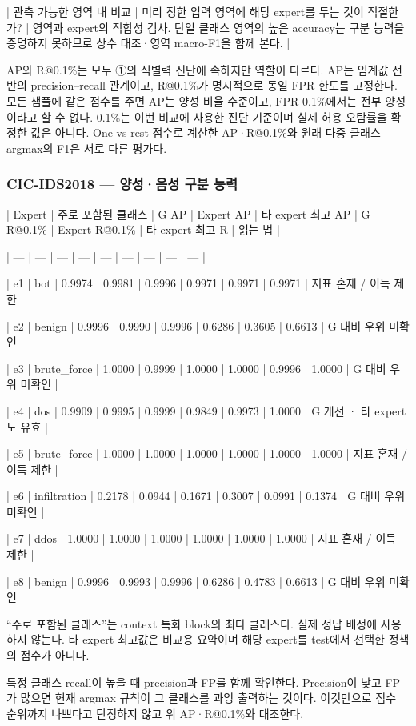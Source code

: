 | 관측 가능한 영역 내 비교 | 미리 정한 입력 영역에 해당 expert를 두는 것이 적절한가? | 영역과 expert의 적합성 검사. 단일 클래스 영역의 높은 accuracy는 구분 능력을 증명하지 못하므로 상수 대조·영역 macro-F1을 함께 본다. |

AP와 R@0.1\%는 모두 ①의 식별력 진단에 속하지만 역할이 다르다. AP는 임계값 전반의 precision–recall 관계이고, R@0.1\%가 명시적으로 동일 FPR 한도를 고정한다. 모든 샘플에 같은 점수를 주면 AP는 양성 비율 수준이고, FPR 0.1\%에서는 전부 양성이라고 할 수 없다. 0.1\%는 이번 비교에 사용한 진단 기준이며 실제 허용 오탐률을 확정한 값은 아니다. One-vs-rest 점수로 계산한 AP·R@0.1\%와 원래 다중 클래스 argmax의 F1은 서로 다른 평가다.

\subsubsection{CIC-IDS2018 — 양성·음성 구분 능력}
| Expert | 주로 포함된 클래스 | G AP | Expert AP | 타 expert 최고 AP | G R@0.1\% | Expert R@0.1\% | 타 expert 최고 R | 읽는 법 |

| --- | --- | --- | --- | --- | --- | --- | --- | --- |

| e1 | bot | 0.9974 | 0.9981 | 0.9996 | 0.9971 | 0.9971 | 0.9971 | 지표 혼재 /\allowbreak{} 이득 제한 |

| e2 | benign | 0.9996 | 0.9990 | 0.9996 | 0.6286 | 0.3605 | 0.6613 | G 대비 우위 미확인 |

| e3 | brute\_\allowbreak{}force | 1.0000 | 0.9999 | 1.0000 | 1.0000 | 0.9996 | 1.0000 | G 대비 우위 미확인 |

| e4 | dos | 0.9909 | 0.9995 | 0.9999 | 0.9849 | 0.9973 | 1.0000 | G 개선 · 타 expert도 유효 |

| e5 | brute\_\allowbreak{}force | 1.0000 | 1.0000 | 1.0000 | 1.0000 | 1.0000 | 1.0000 | 지표 혼재 /\allowbreak{} 이득 제한 |

| e6 | infiltration | 0.2178 | 0.0944 | 0.1671 | 0.3007 | 0.0991 | 0.1374 | G 대비 우위 미확인 |

| e7 | ddos | 1.0000 | 1.0000 | 1.0000 | 1.0000 | 1.0000 | 1.0000 | 지표 혼재 /\allowbreak{} 이득 제한 |

| e8 | benign | 0.9996 | 0.9993 | 0.9996 | 0.6286 | 0.4783 | 0.6613 | G 대비 우위 미확인 |

“주로 포함된 클래스”는 context 특화 block의 최다 클래스다. 실제 정답 배정에 사용하지 않는다. 타 expert 최고값은 비교용 요약이며 해당 expert를 test에서 선택한 정책의 점수가 아니다.

특정 클래스 recall이 높을 때 precision과 FP를 함께 확인한다. Precision이 낮고 FP가 많으면 현재 argmax 규칙이 그 클래스를 과잉 출력하는 것이다. 이것만으로 점수 순위까지 나쁘다고 단정하지 않고 위 AP·R@0.1\%와 대조한다.

